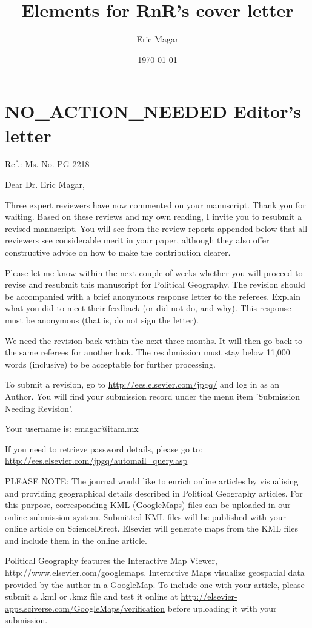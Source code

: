 \documentclass{article}
\author{Eric Magar}
\date{\today}
\title{Elements for RnR's cover letter}
\begin{document}
\maketitle
\tableofcontents


\section{{\bfseries\sffamily NO\_ACTION\_NEEDED} Editor's letter}
\label{sec:orgheadline1}
Ref.:  Ms. No. PG-2218

Dear Dr. Eric Magar,

Three expert reviewers have now commented on your manuscript. Thank you for waiting. Based on these reviews and my own reading, I invite you to resubmit a revised manuscript. You will see from the review reports appended below that all reviewers see considerable merit in your paper, although they also offer constructive advice on how to make the contribution clearer.

Please let me know within the next couple of weeks whether you will proceed to revise and resubmit this manuscript for Political Geography. The revision should be accompanied with a brief anonymous response letter to the referees. Explain what you did to meet their feedback (or did not do, and why). This response must be anonymous (that is, do not sign the letter).

We need the revision back within the next three months. It will then go back to the same referees for another look. The resubmission must stay below 11,000 words (inclusive) to be acceptable for further processing.

To submit a revision, go to \url{http://ees.elsevier.com/jpgq/} and log in as an Author.  You will find your submission record under the menu item 'Submission Needing Revision'.

Your username is: emagar@itam.mx

If you need to retrieve password details, please go to:
\url{http://ees.elsevier.com/jpgq/automail_query.asp}

PLEASE NOTE: The journal would like to enrich online articles by visualising and providing geographical details described in Political Geography articles. For this purpose, corresponding KML (GoogleMaps) files can be uploaded in our online submission system. Submitted KML files will be published with your online article on ScienceDirect. Elsevier will generate maps from the KML files and include them in the online article.

Political Geography features the Interactive Map Viewer, \url{http://www.elsevier.com/googlemaps}. Interactive Maps visualize geospatial data provided by the author in a GoogleMap. To include one with your article, please submit a .kml or .kmz file and test it online at \url{http://elsevier-apps.sciverse.com/GoogleMaps/verification} before uploading it with your submission.
\end{document}
